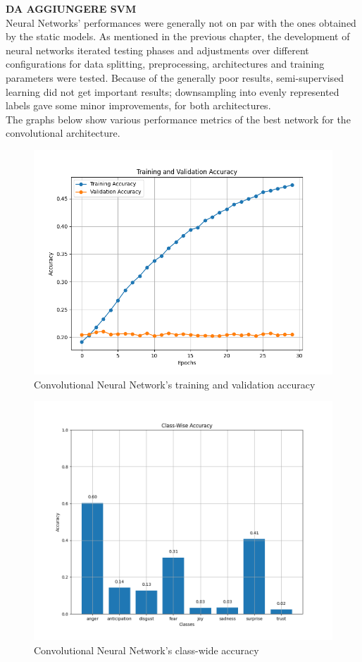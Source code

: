 \textbf{DA AGGIUNGERE SVM}\\

Neural Networks' performances were generally not on par with the ones obtained by
the static models.
As mentioned in the previous chapter, the development of neural networks
iterated testing phases and adjustments over different configurations for data
splitting, preprocessing, architectures and training parameters were tested.
Because of the generally poor results, semi-supervised learning did not get
important results; downsampling into evenly represented labels gave some
minor improvements, for both architectures.\\

The graphs below show various performance metrics of the best network for the
convolutional architecture.
\begin{figure}[H]
    \centering
    \includegraphics[width=0.7\linewidth]{pictures/cnn_accuracy.png}
    \caption{Convolutional Neural Network's training and validation accuracy}
    \label{fig:cnn_train_val_acc}
\end{figure}

\begin{figure}[H]
    \centering
    \includegraphics[width=0.7\linewidth]{pictures/cnn_class_accuracy.png}
    \caption{Convolutional Neural Network's class-wide accuracy}
    \label{fig:cnn_classacc}
\end{figure}

